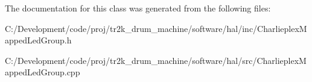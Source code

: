 The documentation for this class was generated from the following files\+:\begin{DoxyCompactItemize}
\item 
C\+:/\+Development/code/proj/tr2k\+\_\+drum\+\_\+machine/software/hal/inc/Charlieplex\+Mapped\+Led\+Group.\+h\item 
C\+:/\+Development/code/proj/tr2k\+\_\+drum\+\_\+machine/software/hal/src/Charlieplex\+Mapped\+Led\+Group.\+cpp\end{DoxyCompactItemize}
